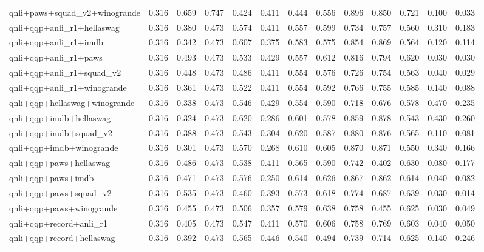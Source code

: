 \begin{table}[t]
\begin{tabular}{lrrrrrrrrrrrr}
    qnli+paws+squad\_v2+winogrande & 0.316 & 0.659 & 0.747 & 0.424 & 0.411 & 0.444 & 0.556 & 0.896 & 0.850 & 0.721 & 0.100 & 0.033 \\
    qnli+qqp+anli\_r1+hellaswag & 0.316 & 0.380 & 0.473 & 0.574 & 0.411 & 0.557 & 0.599 & 0.734 & 0.757 & 0.560 & 0.310 & 0.183 \\
    qnli+qqp+anli\_r1+imdb & 0.316 & 0.342 & 0.473 & 0.607 & 0.375 & 0.583 & 0.575 & 0.854 & 0.869 & 0.564 & 0.120 & 0.114 \\
    qnli+qqp+anli\_r1+paws & 0.316 & 0.493 & 0.473 & 0.533 & 0.429 & 0.557 & 0.612 & 0.816 & 0.794 & 0.620 & 0.030 & 0.030 \\
    qnli+qqp+anli\_r1+squad\_v2 & 0.316 & 0.448 & 0.473 & 0.486 & 0.411 & 0.554 & 0.576 & 0.726 & 0.754 & 0.563 & 0.040 & 0.029 \\
    qnli+qqp+anli\_r1+winogrande & 0.316 & 0.361 & 0.473 & 0.522 & 0.411 & 0.554 & 0.592 & 0.766 & 0.755 & 0.585 & 0.140 & 0.088 \\
    qnli+qqp+hellaswag+winogrande & 0.316 & 0.338 & 0.473 & 0.546 & 0.429 & 0.554 & 0.590 & 0.718 & 0.676 & 0.578 & 0.470 & 0.235 \\
    qnli+qqp+imdb+hellaswag & 0.316 & 0.324 & 0.473 & 0.620 & 0.286 & 0.601 & 0.578 & 0.859 & 0.878 & 0.543 & 0.430 & 0.260 \\
    qnli+qqp+imdb+squad\_v2 & 0.316 & 0.388 & 0.473 & 0.543 & 0.304 & 0.620 & 0.587 & 0.880 & 0.876 & 0.565 & 0.110 & 0.081 \\
    qnli+qqp+imdb+winogrande & 0.316 & 0.301 & 0.473 & 0.570 & 0.268 & 0.610 & 0.605 & 0.870 & 0.871 & 0.550 & 0.340 & 0.166 \\
    qnli+qqp+paws+hellaswag & 0.316 & 0.486 & 0.473 & 0.538 & 0.411 & 0.565 & 0.590 & 0.742 & 0.402 & 0.630 & 0.080 & 0.177 \\
    qnli+qqp+paws+imdb & 0.316 & 0.471 & 0.473 & 0.576 & 0.250 & 0.614 & 0.626 & 0.867 & 0.862 & 0.614 & 0.040 & 0.082 \\
    qnli+qqp+paws+squad\_v2 & 0.316 & 0.535 & 0.473 & 0.460 & 0.393 & 0.573 & 0.618 & 0.774 & 0.687 & 0.639 & 0.030 & 0.014 \\
    qnli+qqp+paws+winogrande & 0.316 & 0.455 & 0.473 & 0.506 & 0.357 & 0.579 & 0.638 & 0.758 & 0.455 & 0.625 & 0.030 & 0.049 \\
    qnli+qqp+record+anli\_r1 & 0.316 & 0.405 & 0.473 & 0.547 & 0.411 & 0.570 & 0.606 & 0.758 & 0.769 & 0.603 & 0.040 & 0.050 \\
    qnli+qqp+record+hellaswag & 0.316 & 0.392 & 0.473 & 0.565 & 0.446 & 0.540 & 0.494 & 0.739 & 0.714 & 0.625 & 0.140 & 0.246 \\

\end{tabular}
\end{table}
